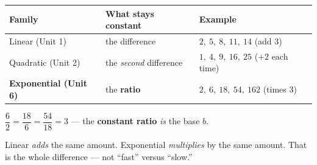 \documentclass[aspectratio=169, 11pt]{beamer}
\begin{document}
\begin{frame}[t, plain]
  \begin{center}
  \renewcommand{\arraystretch}{1.4}
  \begin{tabular}{lll}
  \hline
  \textbf{Family} & \textbf{What stays constant} & \textbf{Example} \\
  \hline
  Linear (Unit 1) & the difference & $2,\ 5,\ 8,\ 11,\ 14$ \quad (add $3$) \\
  Quadratic (Unit 2) & the \emph{second} difference & $1,\ 4,\ 9,\ 16,\ 25$ \quad ($+2$ each time) \\
  \textbf{Exponential (Unit 6)} & the \textbf{ratio} & $2,\ 6,\ 18,\ 54,\ 162$ \quad (times $3$) \\
  \hline
  \end{tabular}
  \end{center}
  \vspace{4pt}
  \begin{center}
    $\dfrac{6}{2}=\dfrac{18}{6}=\dfrac{54}{18}=3$ \quad --- the \textbf{constant ratio} \emph{is} the
    base $b$.
  \end{center}
  \vspace{2pt}
  \begin{center}
    {\footnotesize Linear \emph{adds} the same amount. Exponential \emph{multiplies} by the same
    amount. That is the whole difference --- not ``fast'' versus ``slow.''}
  \end{center}
\end{frame}
\end{document}
